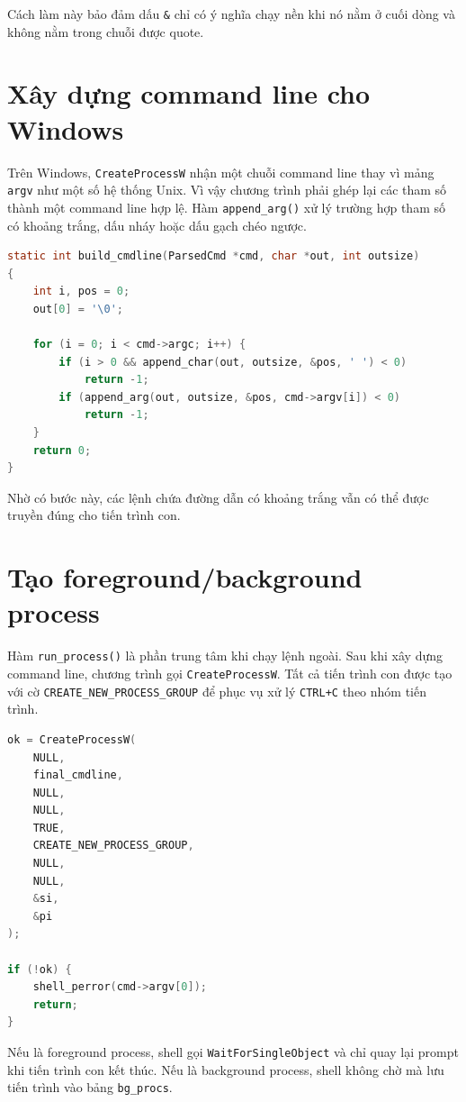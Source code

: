 \documentclass[13pt,a4paper,oneside]{extreport}
\begin{document}
Cách làm này bảo đảm dấu \texttt{\&} chỉ có ý nghĩa chạy nền khi nó nằm ở cuối dòng và không nằm trong chuỗi được quote.

\section{Xây dựng command line cho Windows}

Trên Windows, \texttt{CreateProcessW} nhận một chuỗi command line thay vì mảng \texttt{argv} như một số hệ thống Unix. Vì vậy chương trình phải ghép lại các tham số thành một command line hợp lệ. Hàm \texttt{append\_arg()} xử lý trường hợp tham số có khoảng trắng, dấu nháy hoặc dấu gạch chéo ngược.

\begin{lstlisting}[language=C,caption={Rút gọn hàm ghép argv thành command line}]
static int build_cmdline(ParsedCmd *cmd, char *out, int outsize)
{
    int i, pos = 0;
    out[0] = '\0';

    for (i = 0; i < cmd->argc; i++) {
        if (i > 0 && append_char(out, outsize, &pos, ' ') < 0)
            return -1;
        if (append_arg(out, outsize, &pos, cmd->argv[i]) < 0)
            return -1;
    }
    return 0;
}
\end{lstlisting}

Nhờ có bước này, các lệnh chứa đường dẫn có khoảng trắng vẫn có thể được truyền đúng cho tiến trình con.

\section{Tạo foreground/background process}

Hàm \texttt{run\_process()} là phần trung tâm khi chạy lệnh ngoài. Sau khi xây dựng command line, chương trình gọi \texttt{CreateProcessW}. Tất cả tiến trình con được tạo với cờ \texttt{CREATE\_NEW\_PROCESS\_GROUP} để phục vụ xử lý \texttt{CTRL+C} theo nhóm tiến trình.

\begin{lstlisting}[language=C,caption={Gọi CreateProcessW để tạo tiến trình con}]
ok = CreateProcessW(
    NULL,
    final_cmdline,
    NULL,
    NULL,
    TRUE,
    CREATE_NEW_PROCESS_GROUP,
    NULL,
    NULL,
    &si,
    &pi
);

if (!ok) {
    shell_perror(cmd->argv[0]);
    return;
}
\end{lstlisting}

Nếu là foreground process, shell gọi \texttt{WaitForSingleObject} và chỉ quay lại prompt khi tiến trình con kết thúc. Nếu là background process, shell không chờ mà lưu tiến trình vào bảng \texttt{bg\_procs}.
\end{document}
